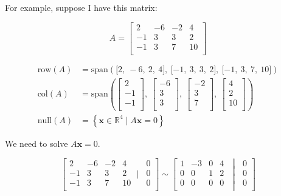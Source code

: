 \documentclass[12pt]{article}
\theoremstyle{plain}
\theoremstyle{remark}
\theoremstyle{definition}
\begin{document}
For example, suppose I have this matrix:

\[A = \begin{bmatrix}
2 & - 6 & - 2 & 4 \\
 - 1 & 3 & 3 & 2 \\
 - 1 & 3 & 7 & 10 \\
\end{bmatrix}\]

\begin{align*}
\text{row}(A) &= \text{span}\left( \lbrack 2,\  - 6,\ 2,\ 4\rbrack,\ \lbrack - 1,\ 3,\ 3,\ 2\rbrack,\ \lbrack - 1,\ 3,\ 7,\ 10\rbrack \right) \\
\text{col}(A) &= \text{span}\left( \begin{bmatrix}2 \\ - 1 \\ - 1 \\\end{bmatrix},\ \begin{bmatrix} - 6 \\3 \\3 \\\end{bmatrix},\ \begin{bmatrix} - 2 \\3 \\7 \\\end{bmatrix},\ \begin{bmatrix}4 \\2 \\10 \\\end{bmatrix} \right) \\
\text{null}(A) &= \left\{ \mathbf{x} \in \mathbb{R}^{4}\mid A\mathbf{x} = 0 \right\}
\end{align*}


We need to solve \(A\mathbf{x} = 0\).

\[\left\lbrack \begin{matrix}
2 & - 6 & - 2 & 4 \\
 - 1 & 3 & 3 & 2 \\
 - 1 & 3 & 7 & 10 \\
\end{matrix}\mid\,\begin{matrix}
0 \\
0 \\
0 \\
\end{matrix} \right\rbrack\sim\left\lbrack \begin{matrix}
1 & - 3 & 0 & 4 \\
0 & 0 & 1 & 2 \\
0 & 0 & 0 & 0 \\
\end{matrix}\;\middle|\;\begin{matrix}
0 \\
0 \\
0 \\
\end{matrix} \right\rbrack\]
\end{document}
